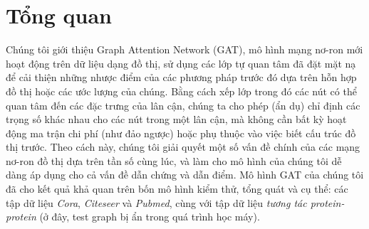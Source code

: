 \chapter*{Tổng quan}

Chúng tôi giới thiệu Graph Attention Network (GAT), mô hình mạng nơ-ron mới hoạt động trên dữ liệu dạng đồ thị, sử dụng các lớp tự quan tâm đã đặt mặt nạ để cải thiện những nhược điểm của các phương pháp trước đó dựa trên hỗn hợp đồ thị hoặc các ước lượng của chúng. 
Bằng cách xếp lớp trong đó các nút có thể quan tâm đến các đặc trưng của lân cận, chúng ta cho phép (ẩn dụ) chỉ định các trọng số khác nhau cho các nút trong một lân cận, mà không cần bất kỳ hoạt động ma trận chi phí (như đảo ngược) hoặc phụ thuộc vào việc biết cấu trúc đồ thị trước.
Theo cách này, chúng tôi giải quyết một số vấn đề chính của các mạng nơ-ron đồ thị dựa trên tần số cùng lúc, và làm cho mô hình của chúng tôi dễ dàng áp dụng cho cả vấn đề dẫn chứng và dẫn điểm. Mô hình GAT của chúng tôi đã cho kết quả khả quan trên bốn mô hình kiểm thử, tổng quát và cụ thể: các tập dữ liệu \emph{Cora}, \emph{Citeseer} và \emph{Pubmed}, cùng với tập dữ liệu \emph{tương tác protein-protein} (ở đây, test graph bị ẩn trong quá trình học máy).
\vspace{8pt}


